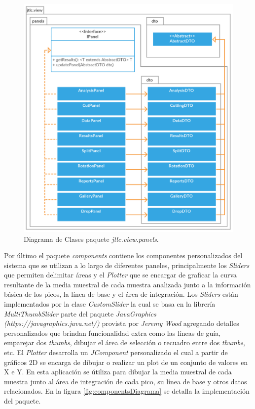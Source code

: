 \begin{figure}[H]
	\centering
	\includegraphics[width=425pt]{imagenes-jtlc/panels}
	\centering
	\vspace{-0.5cm}
	\caption{Diagrama de Clases paquete \textit{jtlc.view.panels}.}
	\label{fig:panelsDiagrama}
\end{figure}

\newpage
Por \'ultimo el paquete \textit{components} contiene los componentes personalizados del sistema que se utilizan a lo largo de diferentes paneles, principalmente los \textit{Sliders} que permiten delimitar \'areas y el \textit{Plotter} que se encargar de graficar la curva resultante de la media muestral de cada muestra analizada junto a la informaci\'on b\'asica de los picos, la l\'inea de base y el \'area de integraci\'on. Los \textit{Sliders} est\'an implementados por la clase \textit{CustomSlider} la cual se basa en la librer\'ia \textit{MultiThumbSlider} parte del paquete \textit{JavaGraphics (https://javagraphics.java.net/)} provista por \textit{Jeremy Wood} agregando detalles personalizados que brindan funcionalidad extra como las l\'ineas de gu\'ia, emparejar dos \textit{thumbs}, dibujar el \'area de selecci\'on o recuadro entre dos \textit{thumbs}, etc. El \textit{Plotter} desarrolla un \textit{JComponent} personalizado el cual a partir de gr\'aficos 2D se encarga de dibujar o realizar un plot de un conjunto de valores en X e Y. En esta aplicaci\'on se \'utiliza para dibujar la media muestral de cada muestra junto al \'area de integraci\'on de cada pico, su l\'inea de base y otros datos relacionados. En la figura \ref{fig:componentsDiagrama} se detalla la implementaci\'on del paquete.

